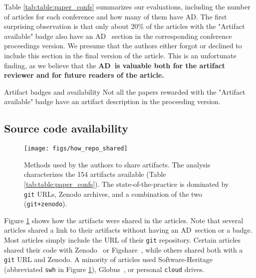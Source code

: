\documentclass[sigconf,natbib=false]{acmart}
\newcommand{\ad}{AD}
\newcommand{\todo}[1]{{\color{red}{TODO: #1}}}
\begin{document}
Table \ref{tab:table:paper_confs} summarizes our evaluations, including the number of articles for each conference and how many of them have \ad.
The first surprising observation is that only about 20\% of the articles with the "Artifact available" badge also have an \ad~ section in the corresponding conference proceedings version.
We presume that the authors either forgot or declined to include this section in the final version of the article.
This is an unfortunate finding, as we believe that the \textbf{\ad\ is valuable both for the artifact reviewer and for future readers of the article.} 

\begin{lesson}{Artifact badges and availability}{}
  Not all the papers rewarded with the "Artifact available" badge have an artifact description in the proceeding version.
\end{lesson}



\subsection{Source code availability}\label{sec:sop:src}

\begin{figure}
  \centering 
  \texttt{[image: figs/how\_repo\_shared]}
  \caption{Methods used by the authors to share artifacts. 
  The analysis characterizes the 154 artifacts available (Table \ref{tab:table:paper_confs}).
  The state-of-the-practice is dominated by \texttt{git} URLs, Zenodo archives, and a combination of the two (\texttt{git+zenodo}).
  }
  \label{fig:how_repo_shared}
\end{figure}

Figure \ref{fig:how_repo_shared} shows how the artifacts were shared in the articles.
Note that several articles shared a link to their artifacts without having an \ad\ section or a badge.
Most articles simply include the URL of their \texttt{git} repository.
Certain articles shared their code with Zenodo\ \cite{zenodo} or Figshare\ \cite{figshare}, while others shared both with a \texttt{git} URL and Zenodo.
A minority of articles used Software-Heritage\ \cite{swheritage} (abbreviated \texttt{swh} in Figure \ref{fig:how_repo_shared}), Globus\ \cite{globus}, or personal \texttt{cloud} drives.
\end{document}
